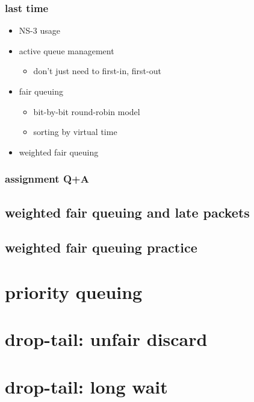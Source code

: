 \date{}
\title{}
\date{}

\begin{frame}
    \titlepage
\end{frame}

\begin{frame}
\frametitle{last time}
\begin{itemize}
\item NS-3 usage
\item active queue management
    \begin{itemize}
    \item don't just need to first-in, first-out
    \end{itemize}
\item fair queuing
    \begin{itemize}
    \item bit-by-bit round-robin model
    \item sorting by virtual time
    \end{itemize}
\item weighted fair queuing
\end{itemize}
\end{frame}

\begin{frame}
\frametitle{assignment Q+A}
\end{frame}


\subsection{weighted fair queuing and late packets}


\subsection{weighted fair queuing practice}


\section{priority queuing}


\section{drop-tail: unfair discard}


\section{drop-tail: long wait}


